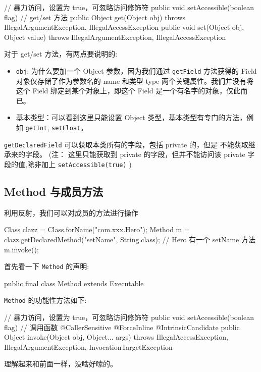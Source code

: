\begin{Java}
// 暴力访问，设置为 true，可忽略访问修饰符
public void setAccessible(boolean flag)
// get/set 方法
public Object get(Object obj) throws IllegalArgumentException, IllegalAccessException
public void set(Object obj, Object value) throws IllegalArgumentException, IllegalAccessException
\end{Java}

对于 get/set 方法，有两点要说明的:
\begin{itemize}
    \item \texttt{obj}: 为什么要加一个 Object 参数，因为我们通过 \texttt{getField} 方法获得的 Field 对象仅存储了作为参数名的 name 和类型 type 两个关键属性。我们并没有将这个 Field 绑定到某个对象上，即这个 Field 是一个有名字的对象，仅此而已。
    \item 基本类型：可以看到这里只能设置 Object 类型，基本类型有专门的方法，例如 \texttt{getInt}, \texttt{setFloat}。
\end{itemize}

\texttt{getDeclaredField} 可以获取本类所有的字段，包括 private 的，但是 不能获取继承来的字段。 (注： 这里只能获取到 private 的字段，但并不能访问该 private 字段的值,除非加上 \texttt{setAccessible(true)} )

\subsection{Method 与成员方法}

利用反射，我们可以对成员的方法进行操作

\begin{Java}
Class clazz = Class.forName("com.xxx.Hero");
Method m = clazz.getDeclaredMethod("setName", String.class);  // Hero 有一个 setName 方法
m.invoke();
\end{Java}

首先看一下 \texttt{Method} 的声明:

\begin{Java}
public final class Method extends Executable
\end{Java}

\texttt{Method} 的功能性方法如下:

\begin{Java}
// 暴力访问，设置为 true，可忽略访问修饰符
public void setAccessible(boolean flag)
// 调用函数
@CallerSensitive
@ForceInline
@IntrinsicCandidate
public Object invoke(Object obj, Object... args) throws IllegalAccessException, IllegalArgumentException, InvocationTargetException
\end{Java}

理解起来和前面一样，没啥好嗦的。

\newpage